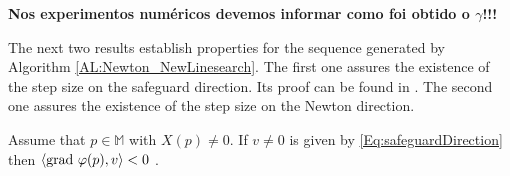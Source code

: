 {\bf Nos experimentos numéricos devemos informar como foi obtido o $\gamma$!!!}

The next two results establish properties for  the sequence generated by Algorithm \ref{AL:Newton_NewLinesearch}. The first one assures the existence of the step size on the safeguard direction. Its proof can be found in \cite[Lemma 3]{MR4102428}. The second one assures the existence of the step size on the Newton direction.


\begin{lemma}\label{L:DescDir}
Assume that $p\in \mathbb{M}$ with  $X(p)\neq 0$.  If  $v \neq 0$ is given by \eqref{Eq:safeguardDirection} then $ \left\langle\operatorname{grad}\,\varphi(p),  v\right\rangle <0$ .
\end{lemma}


